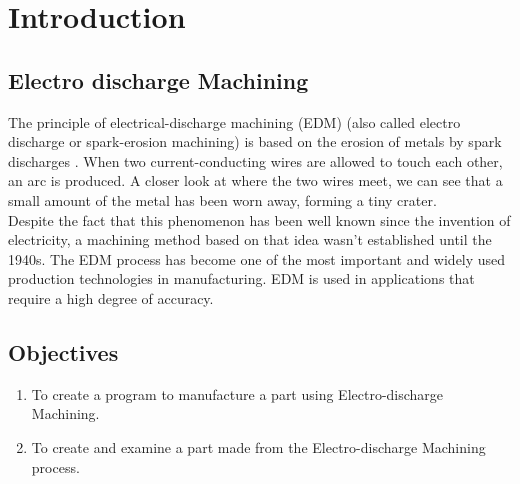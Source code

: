 \section{Introduction}
\lhead{\leftmark}
\label{sec:introduction}
\subsection{Electro discharge Machining}
The principle of electrical-discharge machining (EDM) (also called electro discharge or spark-erosion machining) is based on the erosion of metals by spark discharges \cite{classnotes}. When two current-conducting wires are allowed to touch each other, an arc is produced. A closer look at where the two wires meet, we can see that a small amount of the metal has been worn away, forming a tiny crater.\\
Despite the fact that this phenomenon has been well known since the invention of electricity, a machining method based on that idea wasn't established until the 1940s. The EDM process has become one of the most important and widely used production technologies in manufacturing\cite{youssef2020non}. EDM is used in applications that require a high degree of accuracy\cite{youssef2020non}.
\subsection{Objectives}
\begin{enumerate}
\item To create a program to manufacture a part using Electro-discharge Machining.
\item To create and examine a part made from the Electro-discharge Machining process.
\end{enumerate}
